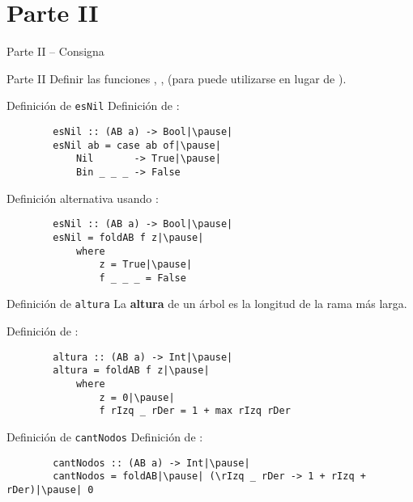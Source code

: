 \section{Parte II}

\begin{frame}{Parte II -- Consigna}
    \begin{exampleblock}{Parte II}
        Definir las funciones , ,  (para  puede utilizarse  en lugar de ).
    \end{exampleblock}
\end{frame}

\begin{frame}[fragile]{Definición de \texttt{esNil}}
    Definición de :

    \pause

    \begin{verbatim}
        esNil :: (AB a) -> Bool|\pause|
        esNil ab = case ab of|\pause|
            Nil       -> True|\pause|
            Bin _ _ _ -> False
    \end{verbatim}

    \pause

    Definición alternativa usando :
    \begin{verbatim}
        esNil :: (AB a) -> Bool|\pause|
        esNil = foldAB f z|\pause|
            where
                z = True|\pause|
                f _ _ _ = False
    \end{verbatim}
\end{frame}

\begin{frame}[fragile]{Definición de \texttt{altura}}
    La \textbf{altura} de un árbol es la longitud de la rama más larga.

    \pause

    Definición de :

    \begin{verbatim}
        altura :: (AB a) -> Int|\pause|
        altura = foldAB f z|\pause|
            where
                z = 0|\pause|
                f rIzq _ rDer = 1 + max rIzq rDer
    \end{verbatim}
\end{frame}

\begin{frame}[fragile]{Definición de \texttt{cantNodos}}
    Definición de :

    \pause

    \begin{verbatim}
        cantNodos :: (AB a) -> Int|\pause|
        cantNodos = foldAB|\pause| (\rIzq _ rDer -> 1 + rIzq + rDer)|\pause| 0
    \end{verbatim}
\end{frame}
